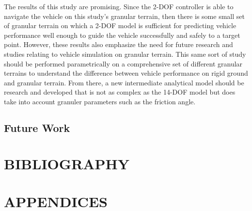 \documentclass[12pt,onecolumn]{article}
\newcommand{\CHRONO}{{\sffamily{{Chrono}}}}
\begin{document}
The results of this study are promising. Since the 2-DOF controller is able to navigate the {\CHRONO} vehicle on this study's granular terrain, then there is some small set of granular terrain on which a 2-DOF model is sufficient for predicting vehicle performance well enough to guide the vehicle successfully and safely to a target point. However, these results also emphasize the need for future research and studies relating to vehicle simulation on granular terrain. This same sort of study should be performed parametrically on a comprehensive set of different granular terrains to understand the difference between vehicle performance on rigid ground and granular terrain. From there, a new intermediate analytical model should be research and developed that is not as complex as the 14-DOF model but does take into account granuler parameters such as the friction angle. 

\subsection{Future Work}\label{FutureWork}

\newpage
\section{BIBLIOGRAPHY}\label{s:bibliography}




\newpage
\section{APPENDICES}\label{s:appendices}

\end{document}
